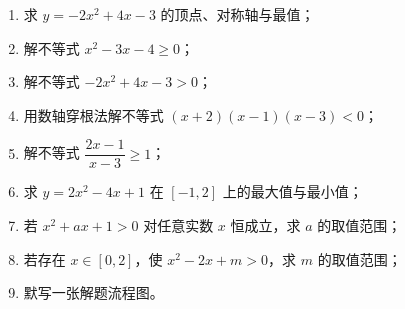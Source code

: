 \begin{afterclass}
\begin{enumerate}
  \item 求 $y=-2x^2+4x-3$ 的顶点、对称轴与最值；
  \item 解不等式 $x^2-3x-4\geq0$；
  \item 解不等式 $-2x^2+4x-3>0$；
  \item 用数轴穿根法解不等式 $(x+2)(x-1)(x-3)<0$；
  \item 解不等式 $\dfrac{2x-1}{x-3}\geq1$；
  \item 求 $y=2x^2-4x+1$ 在 $[-1,2]$ 上的最大值与最小值；
  \item 若 $x^2+ax+1>0$ 对任意实数 $x$ 恒成立，求 $a$ 的取值范围；
  \item 若存在 $x\in[0,2]$，使 $x^2-2x+m>0$，求 $m$ 的取值范围；
  \item 默写一张解题流程图。
\end{enumerate}
\end{afterclass}
